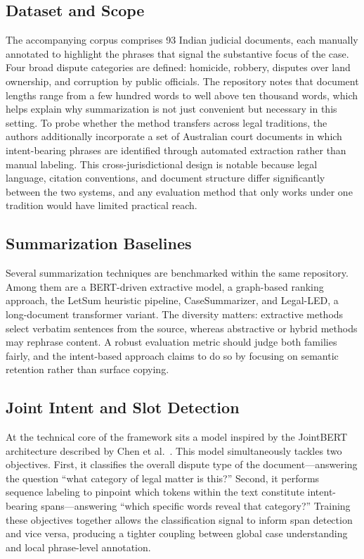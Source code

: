\documentclass[conference]{IEEEtran}
\begin{document}
\subsection{Dataset and Scope}
The accompanying corpus comprises 93 Indian judicial documents, each manually annotated to highlight the phrases that signal the substantive focus of the case. Four broad dispute categories are defined: homicide, robbery, disputes over land ownership, and corruption by public officials. The repository notes that document lengths range from a few hundred words to well above ten thousand words, which helps explain why summarization is not just convenient but necessary in this setting. To probe whether the method transfers across legal traditions, the authors additionally incorporate a set of Australian court documents in which intent-bearing phrases are identified through automated extraction rather than manual labeling. This cross-jurisdictional design is notable because legal language, citation conventions, and document structure differ significantly between the two systems, and any evaluation method that only works under one tradition would have limited practical reach.

\subsection{Summarization Baselines}
Several summarization techniques are benchmarked within the same repository. Among them are a BERT-driven extractive model, a graph-based ranking approach, the LetSum heuristic pipeline, CaseSummarizer, and Legal-LED, a long-document transformer variant. The diversity matters: extractive methods select verbatim sentences from the source, whereas abstractive or hybrid methods may rephrase content. A robust evaluation metric should judge both families fairly, and the intent-based approach claims to do so by focusing on semantic retention rather than surface copying.

\subsection{Joint Intent and Slot Detection}
At the technical core of the framework sits a model inspired by the JointBERT architecture described by Chen et al.\ \cite{chen2019}. This model simultaneously tackles two objectives. First, it classifies the overall dispute type of the document---answering the question ``what category of legal matter is this?'' Second, it performs sequence labeling to pinpoint which tokens within the text constitute intent-bearing spans---answering ``which specific words reveal that category?'' Training these objectives together allows the classification signal to inform span detection and vice versa, producing a tighter coupling between global case understanding and local phrase-level annotation.
\end{document}

